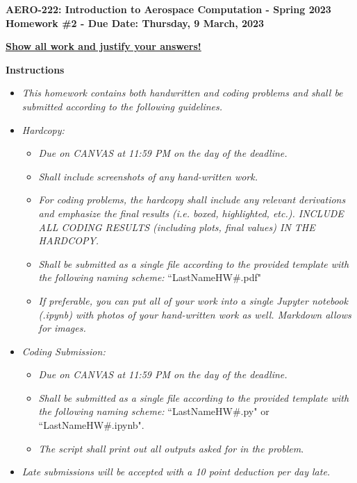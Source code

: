 \documentclass[12pt]{article}
\begin{document}
\newif\ifsolution %


\begin{center}{\bf AERO-222: Introduction to Aerospace Computation - Spring 2023\\ Homework \#2 - Due Date: Thursday, 9 March, 2023} \vspace{0.5cm}

\textbf{\underline{Show all work and justify your answers!}} \vspace{0.5cm}
\end{center}

{\Large \textbf{Instructions}}
\begin{itemize}
	\item \textit{This homework contains both handwritten and coding problems and shall be submitted according to the following guidelines.}
	\item \textit{Hardcopy:}
	\begin{itemize}
	 \item \textit{Due on CANVAS at 11:59 PM on the day of the deadline.}
	 \item \textit{Shall include screenshots of any hand-written work.}
	 \item \textit{For coding problems, the hardcopy shall include any relevant derivations and emphasize the final results (i.e. boxed, highlighted, etc.). INCLUDE ALL CODING RESULTS (including plots, final values) IN THE HARDCOPY.}
	 \item \textit{Shall be submitted as a single file according to the provided template with the following naming scheme:} ``LastNameHW\#.pdf"
	 \item \textit{If preferable, you can put all of your work into a single Jupyter notebook (.ipynb) with photos of your hand-written work as well. Markdown allows for images. }
	\end{itemize}
	\item \textit{Coding Submission:}
	\begin{itemize}
	 \item \textit{Due on CANVAS at 11:59 PM on the day of the deadline.}
	 \item \textit{Shall be submitted as a single file according to the provided template with the following naming scheme:} ``LastNameHW\#.py" or ``LastNameHW\#.ipynb".
	 \item \textit{The script shall print out all outputs asked for in the problem}.
	\end{itemize}
 \item \textit{Late submissions will be accepted with a 10 point deduction per day late.}
\end{itemize}
\hrulefill
\end{document}
